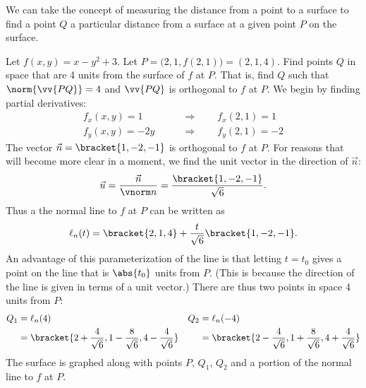 We can take the concept of measuring the distance from a point to a surface to find a point $Q$ a particular distance from a surface at a given point $P$ on the surface.

\begin{example}\label{ex_tpl5}
Let $f(x,y) = x-y^2+3$. Let $P = \bigl(2,1,f(2,1)\bigr) = (2,1,4)$. Find points $Q$ in space that are 4 units from the surface of $f$ at $P$. That is, find $Q$ such that $\norm{\vv{PQ}}=4$ and $\vv{PQ}$ is orthogonal to $f$ at $P$.
\solution
We begin by finding partial derivatives:
\begin{align*}
f_x(x,y)  =1  \qquad &\Rightarrow \qquad f_x(2,1) = 1\\
f_y(x,y) = -2y \qquad &\Rightarrow \qquad  f_y(2,1) = -2
\end{align*}
The vector $\vec n=\bracket{1,-2,-1}$ is orthogonal to $f$ at $P$. For reasons that will become more clear in a moment, we find the unit vector in the direction of $\vec n$:
\[\vec u = \frac{\vec n}{\vnorm n}=\frac{\bracket{1,-2,-1}}{\sqrt6} %
.\]
Thus a the normal line to $f$ at $P$ can be written as
\[\ell_n(t) =\bracket{2,1,4}+\frac t{\sqrt6}\bracket{1,-2,-1}%
.\]
An advantage of this parameterization of the line is that letting $t=t_0$ gives a point on the line that is $\abs{t_0}$ units from $P$. (This is because the direction of the line is given in terms of a unit vector.) There are thus two points in space 4 units from $P$:
%
%
%
\begin{align*}
Q_1 &= \ell_n(4) & Q_2 &= \ell_n(-4) \\
  &=\bracket{2+\frac4{\sqrt6},1-\frac8{\sqrt6},4-\frac4{\sqrt6}}
  & & =\bracket{2-\frac4{\sqrt6},1+\frac8{\sqrt6},4+\frac4{\sqrt6}}
\end{align*}
The surface is graphed along with points $P$, $Q_1$, $Q_2$ and a portion of the normal line to $f$ at $P$.
\end{example}

